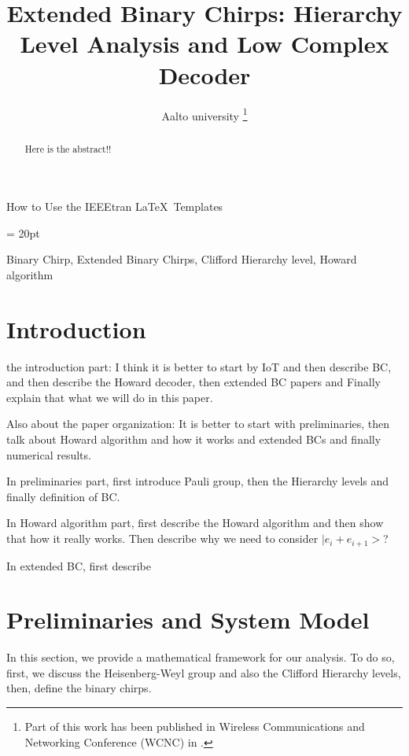 \documentclass[lettersize,journal,onecolumn]{IEEEtran}
\begin{document}
\title{Extended Binary Chirps: Hierarchy Level Analysis and Low Complex Decoder}
\author{ Aalto university
\thanks{Part of this work has been published in Wireless Communications and Networking Conference (WCNC) in \cite{Pllaha22LCGbc}.} }

%
{How to Use the IEEEtran \LaTeX \ Templates}

\maketitle
\baselineskip = 20pt
\begin{abstract}
Here is the abstract!!
\end{abstract}

\begin{IEEEkeywords}
Binary Chirp, Extended Binary Chirps, Clifford Hierarchy level, Howard algorithm 
\end{IEEEkeywords}


\section{Introduction}
 the introduction part: I think it is better to start by IoT and then describe BC, and then describe the Howard decoder, then extended BC papers and Finally explain that what we will do in this paper. 

Also about the paper organization: It is better to start with preliminaries, then talk about Howard algorithm and how it works and extended BCs and finally numerical results. 

In preliminaries part, first introduce Pauli group, then the Hierarchy levels and finally definition of BC.

In Howard algorithm part, first describe the Howard algorithm and then show that how it really works. Then describe why we need to consider $|e_i+e_{i+1}>$?

In extended BC, first describe 

\section{Preliminaries and System Model}
\noindent In this section, we provide a mathematical framework for our analysis. To do so, first, we discuss the Heisenberg-Weyl group
and also the Clifford Hierarchy levels, then, define the binary chirps.
\end{document}
